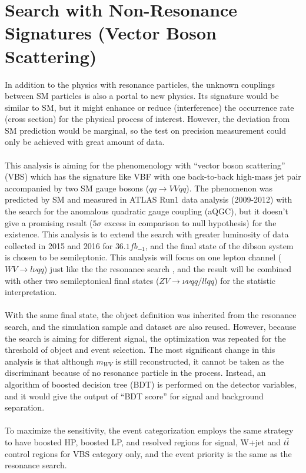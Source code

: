 \chapter{Search with Non-Resonance Signatures (Vector Boson Scattering)}
In addition to the physics with resonance particles, the unknown couplings between SM particles is also a portal to new physics. Its signature would be similar to SM, but it might enhance or reduce (interference) the occurrence rate (cross section) for the physical process of interest. However, the deviation from SM prediction would be marginal, so the test on precision measurement could only be achieved with great amount of data. 
\\
\\This analysis is aiming for the phenomenology with ``vector boson scattering'' (VBS) which has the signature like VBF with one back-to-back high-mass jet pair accompanied by two SM gauge bosons ($qq \to VVqq$). The phenomenon was predicted by SM and measured in ATLAS Run1 data analysis (2009-2012) with the search for the anomalous quadratic gauge coupling (aQGC), but it doesn't give a promising result ($5\sigma$ excess in comparison to null hypothesis) for the existence. This analysis is to extend the search with greater luminosity of data collected in 2015 and 2016 for $36.1fb_{-1}$, and the final state of the dibson system is chosen to be semileptonic.  This analysis will focus on one lepton channel ($WV \to l\nu qq$) just like the the resonance search , and the result will be combined with other two semileptonical final states ($ZV \to \nu\nu qq/llqq$) for the statistic interpretation.
\\
\\With the same final state, the object definition was inherited from the resonance search, and the simulation sample and dataset are also reused. However, because the search is aiming for different signal, the optimization was repeated for the threshold of object and event selection.  The most significant change in this analysis is that although $m_{WV}$ is still reconstructed, it cannot be taken as the discriminant because of no resonance particle in the process. Instead, an algorithm of boosted decision tree (BDT) is performed on the detector variables, and it would give the output of ``BDT score'' for signal and background separation.
\\ 
\\To maximize the sensitivity, the event categorization employs the same strategy to have boosted HP, boosted LP, and resolved regions for signal, W+jet and $t\bar{t}$ control regions for VBS category only, and the event priority is the same as the resonance search.
